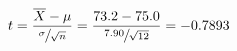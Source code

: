 \begin{equation*}
    t=\frac{\overline{X}-\mu}{\sfrac{\sigma}{\sqrt{n}}}
    =\frac{73.2-75.0}{\sfrac{7.90}{\sqrt{12}}}=-0.7893
    \end{equation*}